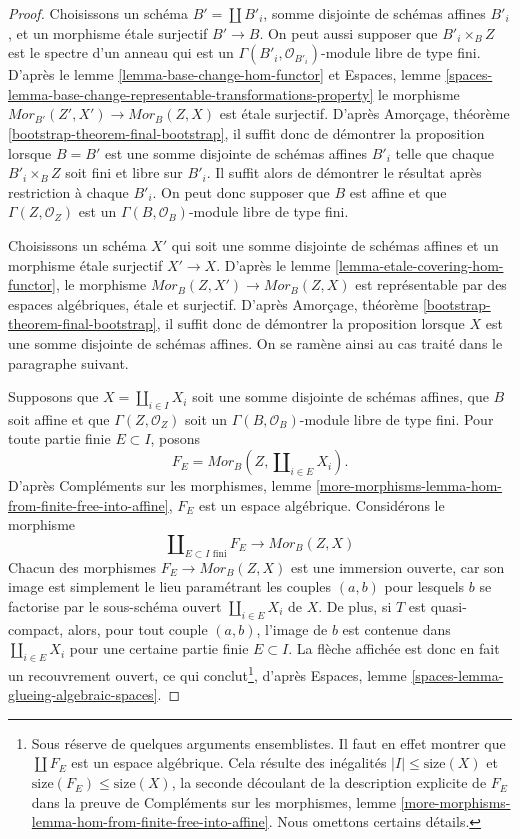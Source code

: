 \begin{proof}
Choisissons un schéma $B' = \coprod B'_i$, somme disjointe de
schémas affines $B'_i$, et un morphisme étale surjectif $B' \to B$.
On peut aussi supposer que $B'_i \times_B Z$ est le spectre d'un anneau
qui est un $\Gamma(B'_i, \mathcal{O}_{B'_i})$-module libre de type fini.
D'après le
lemme \ref{lemma-base-change-hom-functor}
et
Espaces, lemme
\ref{spaces-lemma-base-change-representable-transformations-property}
le morphisme $\mathit{Mor}_{B'}(Z', X') \to \mathit{Mor}_B(Z, X)$
est étale surjectif. D'après
Amorçage, théorème \ref{bootstrap-theorem-final-bootstrap},
il suffit donc de démontrer la proposition lorsque $B = B'$ est une somme disjointe de
schémas affines $B'_i$ telle que chaque $B'_i \times_B Z$ soit fini et libre
sur $B'_i$. Il suffit alors de démontrer le résultat après restriction
à chaque $B'_i$. On peut donc supposer que $B$ est affine et que
$\Gamma(Z, \mathcal{O}_Z)$ est un $\Gamma(B, \mathcal{O}_B)$-module libre de type fini.

\medskip\noindent
Choisissons un schéma $X'$ qui soit une somme disjointe de schémas affines et
un morphisme étale surjectif $X' \to X$. D'après le
lemme \ref{lemma-etale-covering-hom-functor},
le morphisme $\mathit{Mor}_B(Z, X') \to \mathit{Mor}_B(Z, X)$
est représentable par des espaces algébriques, étale et surjectif.
D'après
Amorçage, théorème \ref{bootstrap-theorem-final-bootstrap},
il suffit donc de démontrer la proposition lorsque $X$ est une somme disjointe
de schémas affines. On se ramène ainsi au cas traité dans le paragraphe
suivant.

\medskip\noindent
Supposons que $X = \coprod_{i \in I} X_i$ soit une somme disjointe de schémas
affines, que $B$ soit affine et que $\Gamma(Z, \mathcal{O}_Z)$ soit un
$\Gamma(B, \mathcal{O}_B)$-module libre de type fini. Pour toute partie finie
$E \subset I$, posons
$$
F_E = \mathit{Mor}_B(Z, \coprod\nolimits_{i \in E} X_i).
$$
D'après Compléments sur les morphismes,
lemme \ref{more-morphisms-lemma-hom-from-finite-free-into-affine},
$F_E$ est un espace algébrique. Considérons le morphisme
$$
\coprod\nolimits_{E \subset I\text{ fini}} F_E
\longrightarrow
\mathit{Mor}_B(Z, X)
$$
Chacun des morphismes
$F_E \to \mathit{Mor}_B(Z, X)$ est une immersion ouverte, car son image est
simplement le lieu paramétrant les couples $(a, b)$ pour lesquels $b$ se factorise par
le sous-schéma ouvert $\coprod\nolimits_{i \in E} X_i$ de $X$. De plus,
si $T$ est quasi-compact, alors, pour tout couple $(a, b)$, l'image
de $b$ est contenue dans $\coprod\nolimits_{i \in E} X_i$ pour une certaine partie
finie $E \subset I$. La flèche affichée est donc en fait un
recouvrement ouvert, ce qui conclut\footnote{Sous réserve de
quelques arguments ensemblistes. Il faut en effet montrer que
$\coprod F_E$ est un espace algébrique. Cela résulte des inégalités
$|I| \leq \text{size}(X)$ et $\text{size}(F_E) \leq \text{size}(X)$,
la seconde découlant de la description explicite de $F_E$ dans la preuve de
Compléments sur les morphismes,
lemme \ref{more-morphisms-lemma-hom-from-finite-free-into-affine}.
Nous omettons certains détails.}, d'après
Espaces, lemme \ref{spaces-lemma-glueing-algebraic-spaces}.
\end{proof}
